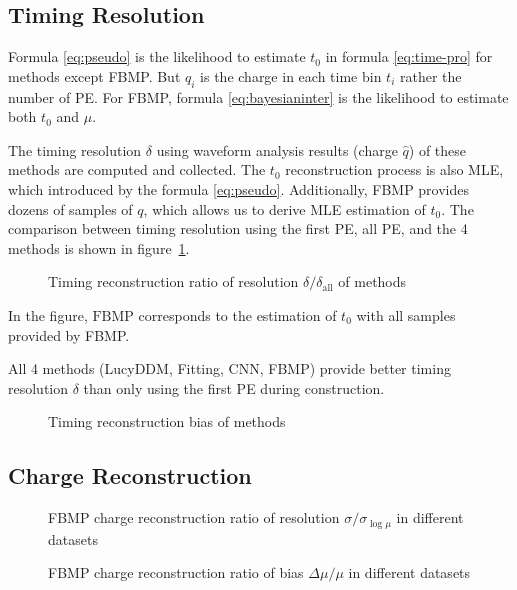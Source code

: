 \subsection{Timing Resolution}
\label{subsec:timeresolution}


Formula \eqref{eq:pseudo} is the likelihood to estimate $t_{0}$ in formula \eqref{eq:time-pro} for methods except FBMP. But $q_{i}$ is the charge in each time bin $t_{i}$ rather the number of PE. For FBMP, formula \eqref{eq:bayesianinter} is the likelihood to estimate both $t_{0}$ and $\mu$. 

The timing resolution $\delta$ using waveform analysis results (charge $\hat{q}$) of these methods are computed and collected. The $t_{0}$ reconstruction process is also MLE, which introduced by the formula \eqref{eq:pseudo}. Additionally, FBMP provides dozens of samples of $q$, which allows us to derive MLE estimation of $t_{0}$. The comparison between timing resolution using the first PE, all PE, and the 4 methods is shown in figure~\ref{fig:deltamethods}. 

\begin{figure}[H]
    \centering
    \resizebox{\textwidth}{!}{}
    \caption{\label{fig:deltamethods} Timing reconstruction ratio of resolution $\delta/\delta_{\mathrm{all}}$ of methods}
\end{figure}

In the figure, $\mathrm{FBMP}$ corresponds to the estimation of $t_{0}$ with all samples provided by FBMP. 

All 4 methods (LucyDDM, Fitting, CNN, FBMP) provide better timing resolution $\delta$ than only using the first PE during construction. 

\begin{figure}[H]
    \centering
    \resizebox{\textwidth}{!}{}
    \caption{Timing reconstruction bias of methods}
\end{figure}

\subsection{Charge Reconstruction}
\label{subsec:chargereconstruction}

\begin{figure}[H]
    \centering
    \resizebox{\textwidth}{!}{}
    \caption{\label{fig:deltamu} FBMP charge reconstruction ratio of resolution $\sigma/\sigma_{\log\mu}$ in different datasets}
\end{figure}

\begin{figure}[H]
    \centering
    \resizebox{\textwidth}{!}{}
    \caption{\label{fig:biasmu} FBMP charge reconstruction ratio of bias $\Delta\mu/\mu$ in different datasets}
\end{figure}

